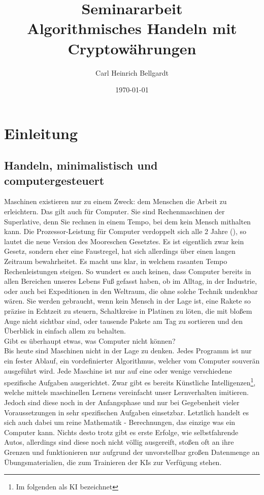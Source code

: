 \documentclass[12pt]{article}
\begin{document}
\begin{titlepage}	
	\title{\LARGE Seminararbeit\\ \large Algorithmisches Handeln mit Cryptowährungen}
	\date{\small \today}
	\author{\small Carl Heinrich Bellgardt}	
	\clearpage\maketitle
	\thispagestyle{empty}
\end{titlepage}

\setcounter{page}{2}
\tableofcontents
\pagebreak
\section{Einleitung}
\subsection{Handeln, minimalistisch und computergesteuert}
	Maschinen existieren nur zu einem Zweck: dem Menschen die Arbeit zu erleichtern. Das gilt auch für Computer. Sie sind Rechenmaschinen der Superlative, denn Sie rechnen in einem Tempo, bei dem kein Mensch mithalten kann. \glqq Die Prozessor-Leistung für Computer verdoppelt sich alle 2 Jahre\grqq{} (\cite{}),  so lautet die neue Version des Mooreschen Gesetztes. Es ist eigentlich zwar kein Gesetz, sondern eher eine Faustregel, hat sich allerdings über einen langen Zeitraum bewahrheitet. Es macht uns klar, in welchem rasanten Tempo Rechenleistungen steigen. So wundert es auch keinen, dass Computer bereits in allen Bereichen unseres Lebens Fuß gefasst haben, ob im Alltag, in der Industrie, oder auch bei Expeditionen in den Weltraum, die ohne solche Technik undenkbar wären. Sie werden gebraucht, wenn kein Mensch in der Lage ist, eine Rakete so präzise in Echtzeit zu steuern, Schaltkreise in Platinen zu löten, die mit bloßem Auge nicht sichtbar sind, oder tausende Pakete am Tag zu sortieren und den Überblick in einfach allem zu behalten.\\
	Gibt es überhaupt etwas, was Computer nicht können?\\
	Bis heute sind Maschinen nicht in der Lage zu denken. Jedes Programm ist nur ein fester Ablauf, ein vordefinierter Algorithmus, welcher vom Computer souverän ausgeführt wird. Jede Maschine ist nur auf eine oder wenige verschiedene spezifische Aufgaben ausgerichtet. Zwar gibt es bereits Künstliche Intelligenzen\footnote{Im folgenden als \glqq KI\grqq{} bezeichnet}, welche mittels maschinellen Lernens vereinfacht unser Lernverhalten imitieren. Jedoch sind diese noch in der Anfangsphase und nur bei Gegebenheit vieler Voraussetzungen in sehr spezifischen Aufgaben einsetzbar. Letztlich handelt es sich auch dabei um reine Mathematik - Berechnungen, das einzige was ein Computer kann. Nichts desto trotz gibt es erste Erfolge, wie selbstfahrende Autos, allerdings sind diese noch nicht völlig ausgereift, stoßen oft an ihre Grenzen und funktionieren nur aufgrund der unvorstellbar großen Datenmenge an Übungsmaterialien, die zum Trainieren der KIs zur Verfügung stehen.\\
\end{document}
